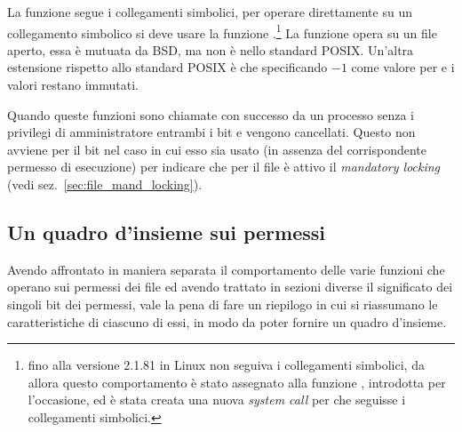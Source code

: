 La funzione  segue i collegamenti simbolici, per operare
direttamente su un collegamento simbolico si deve usare la funzione
.\footnote{fino alla versione 2.1.81 in Linux  non
  seguiva i collegamenti simbolici, da allora questo comportamento è stato
  assegnato alla funzione , introdotta per l'occasione, ed è
  stata creata una nuova \textit{system call} per  che seguisse i
  collegamenti simbolici.} La funzione  opera su un file aperto,
essa è mutuata da BSD, ma non è nello standard POSIX.  Un'altra estensione
rispetto allo standard POSIX è che specificando $-1$ come valore per
 e  i valori restano immutati.

Quando queste funzioni sono chiamate con successo da un processo senza i
privilegi di amministratore entrambi i bit  e  vengono
cancellati. Questo non avviene per il bit  nel caso in cui esso sia
usato (in assenza del corrispondente permesso di esecuzione) per indicare che
per il file è attivo il \textit{mandatory locking} (vedi
sez.~\ref{sec:file_mand_locking}).


\subsection{Un quadro d'insieme sui permessi}
\label{sec:file_riepilogo}

Avendo affrontato in maniera separata il comportamento delle varie funzioni
che operano sui permessi dei file ed avendo trattato in sezioni diverse il
significato dei singoli bit dei permessi, vale la pena di fare un riepilogo in
cui si riassumano le caratteristiche di ciascuno di essi, in modo da poter
fornire un quadro d'insieme.

